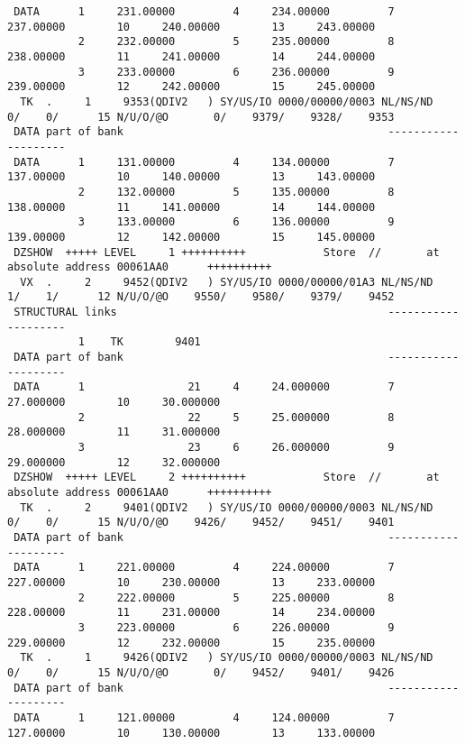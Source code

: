 \begin{Listing}
\begin{verbatim}
 DATA      1     231.00000         4     234.00000         7     237.00000        10     240.00000        13     243.00000
           2     232.00000         5     235.00000         8     238.00000        11     241.00000        14     244.00000
           3     233.00000         6     236.00000         9     239.00000        12     242.00000        15     245.00000
  TK  .     1     9353(QDIV2   ) SY/US/IO 0000/00000/0003 NL/NS/ND    0/    0/      15 N/U/O/@O       0/    9379/    9328/    9353
 DATA part of bank                                         --------------------
 DATA      1     131.00000         4     134.00000         7     137.00000        10     140.00000        13     143.00000
           2     132.00000         5     135.00000         8     138.00000        11     141.00000        14     144.00000
           3     133.00000         6     136.00000         9     139.00000        12     142.00000        15     145.00000
 DZSHOW  +++++ LEVEL     1 ++++++++++            Store  //       at absolute address 00061AA0      ++++++++++
  VX  .     2     9452(QDIV2   ) SY/US/IO 0000/00000/01A3 NL/NS/ND    1/    1/      12 N/U/O/@O    9550/    9580/    9379/    9452
 STRUCTURAL links                                          --------------------
           1    TK        9401
 DATA part of bank                                         --------------------
 DATA      1                21     4     24.000000         7     27.000000        10     30.000000
           2                22     5     25.000000         8     28.000000        11     31.000000
           3                23     6     26.000000         9     29.000000        12     32.000000
 DZSHOW  +++++ LEVEL     2 ++++++++++            Store  //       at absolute address 00061AA0      ++++++++++
  TK  .     2     9401(QDIV2   ) SY/US/IO 0000/00000/0003 NL/NS/ND    0/    0/      15 N/U/O/@O    9426/    9452/    9451/    9401
 DATA part of bank                                         --------------------
 DATA      1     221.00000         4     224.00000         7     227.00000        10     230.00000        13     233.00000
           2     222.00000         5     225.00000         8     228.00000        11     231.00000        14     234.00000
           3     223.00000         6     226.00000         9     229.00000        12     232.00000        15     235.00000
  TK  .     1     9426(QDIV2   ) SY/US/IO 0000/00000/0003 NL/NS/ND    0/    0/      15 N/U/O/@O       0/    9452/    9401/    9426
 DATA part of bank                                         --------------------
 DATA      1     121.00000         4     124.00000         7     127.00000        10     130.00000        13     133.00000

\end{verbatim}
\end{Listing}
